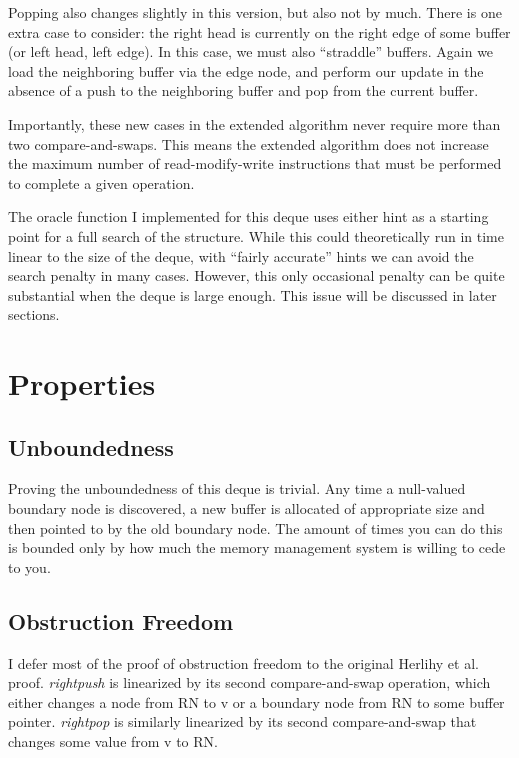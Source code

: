 \documentclass[11pt, letterpaper]{article}
\begin{document}
            Popping also changes slightly in this version, but also not by much. There is one extra case to consider: the right head is currently on the right edge of some buffer (or left head, left edge). In this case, we must also ``straddle'' buffers. Again we load the neighboring buffer via the edge node, and perform our update in the absence of a push to the neighboring buffer and pop from the current buffer.

            Importantly, these new cases in the extended algorithm never require more than two compare-and-swaps. This means the extended algorithm does not increase the maximum number of read-modify-write instructions that must be performed to complete a given operation.

            The oracle function I implemented for this deque uses either hint as a starting point for a full search of the structure. While this could theoretically run in time linear to the size of the deque, with ``fairly accurate'' hints we can avoid the search penalty in many cases. However, this only occasional penalty can be quite substantial when the deque is large enough. This issue will be discussed in later sections.

    \section{Properties}        
        \subsection{Unboundedness}
            Proving the unboundedness of this deque is trivial. Any time a null-valued boundary node is discovered, a new buffer is allocated of appropriate size and then pointed to by the old boundary node. The amount of times you can do this is bounded only by how much the memory management system is willing to cede to you.

        \subsection{Obstruction Freedom}
            I defer most of the proof of obstruction freedom to the original Herlihy et al. proof. \emph{rightpush} is linearized by its second compare-and-swap operation, which either changes a node from RN to v or a boundary node from RN to some buffer pointer. \emph{rightpop} is similarly linearized by its second compare-and-swap that changes some value from v to RN.
\end{document}
